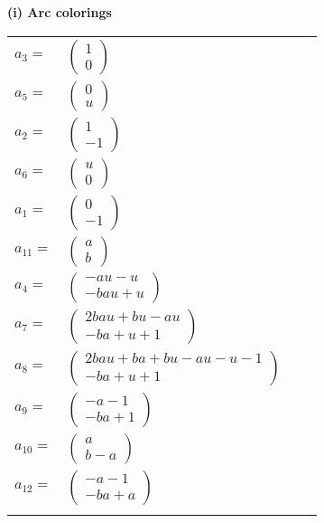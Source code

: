 \documentclass[1p]{elsarticle_modified}
\theoremstyle{definition}
\begin{document}
\flushleft \textbf{(i) Arc colorings}\\
\begin{tabular}{m{7pt} m{180pt} m{7pt} m{180pt} }
\flushright $a_{3}=$&$\begin{pmatrix}1\\0\end{pmatrix}$ \\
\flushright $a_{5}=$&$\begin{pmatrix}0\\u\end{pmatrix}$ \\
\flushright $a_{2}=$&$\begin{pmatrix}1\\-1\end{pmatrix}$ \\
\flushright $a_{6}=$&$\begin{pmatrix}u\\0\end{pmatrix}$ \\
\flushright $a_{1}=$&$\begin{pmatrix}0\\-1\end{pmatrix}$ \\
\flushright $a_{11}=$&$\begin{pmatrix}a\\b\end{pmatrix}$ \\
\flushright $a_{4}=$&$\begin{pmatrix}- a u- u\\- b a u+u\end{pmatrix}$ \\
\flushright $a_{7}=$&$\begin{pmatrix}2 b a u+b u- a u\\- b a+u+1\end{pmatrix}$ \\
\flushright $a_{8}=$&$\begin{pmatrix}2 b a u+b a+b u- a u- u-1\\- b a+u+1\end{pmatrix}$ \\
\flushright $a_{9}=$&$\begin{pmatrix}- a-1\\- b a+1\end{pmatrix}$ \\
\flushright $a_{10}=$&$\begin{pmatrix}a\\b- a\end{pmatrix}$ \\
\flushright $a_{12}=$&$\begin{pmatrix}- a-1\\- b a+a\end{pmatrix}$\\&\end{tabular}
\end{document}
